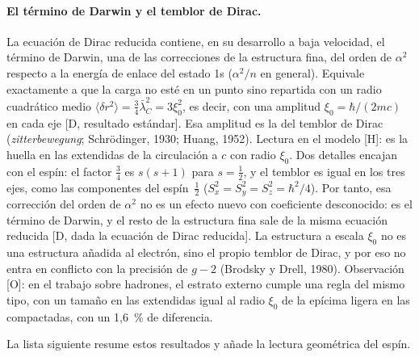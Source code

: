 \documentclass[11pt,a4paper]{article}
\newcommand{\st}[1]{\textup{[#1]}}
\newcommand{\lbar}{\bar{\lambda}}
\newcommand{\apartado}[1]{\paragraph{#1}}
\begin{document}
\apartado{El término de Darwin y el temblor de Dirac.} La ecuación de Dirac reducida contiene, en su desarrollo a baja velocidad, el término de Darwin, una de las correcciones de la estructura fina, del orden de $\alpha^2$ respecto a la energía de enlace del estado 1s ($\alpha^2/n$ en general). Equivale exactamente a que la carga no esté en un punto sino repartida con un radio cuadrático medio $\langle\delta r^2\rangle=\tfrac34\lbar_C^2=3\xi_0^2$, es decir, con una amplitud $\xi_0=\hbar/(2mc)$ en cada eje \st{D, resultado estándar}. Esa amplitud es la del temblor de Dirac (\emph{zitterbewegung}; Schrödinger, 1930; Huang, 1952). Lectura en el modelo \st{H}: es la huella en las extendidas de la circulación a $c$ con radio $\xi_0$. Dos detalles encajan con el espín: el factor $\tfrac34$ es $s(s+1)$ para $s=\tfrac12$, y el temblor es igual en los tres ejes, como las componentes del espín~$\tfrac12$ ($S_x^2=S_y^2=S_z^2=\hbar^2/4$). Por tanto, esa corrección del orden de $\alpha^2$ no es un efecto nuevo con coeficiente desconocido: es el término de Darwin, y el resto de la estructura fina sale de la misma ecuación reducida \st{D, dada la ecuación de Dirac reducida}. La estructura a escala $\xi_0$ no es una estructura añadida al electrón, sino el propio temblor de Dirac, y por eso no entra en conflicto con la precisión de $g-2$ (Brodsky y Drell, 1980). Observación \st{O}: en el trabajo sobre hadrones, el estrato externo cumple una regla del mismo tipo, con un tamaño en las extendidas igual al radio $\xi_0$ de la epícima ligera en las compactadas, con un 1,6~\% de diferencia.

La lista siguiente resume estos resultados y añade la lectura geométrica del espín.
\end{document}

